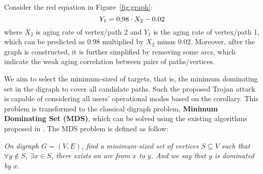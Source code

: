 Consider the red equation in Figure~\ref{fig:graph}:
\begin{equation}
	\centering
	\fontsize{8}{8} \selectfont
	Y_{1} = 0.98 \cdot X_{2} - 0.02
\end{equation}
where $X_{2}$ is aging rate of vertex/path 2 and $Y_{1}$ is the aging rate of vertex/path 1, which can be predicted as 0.98 multiplied by $X_{2}$ minus 0.02.
Moreover, after the graph is constructed, it is further simplified by removing some arcs, which indicate the weak aging correlation between pairs of paths/vertices.

We aim to select the minimum-sized of targets, that is, the minimum dominating set in the digraph to cover all candidate paths. Such the proposed Trojan attack is capable of considering all users' operational modes based on the corollary. This problem is transformed to the classical digraph problem, \textbf{Minimum Dominating Set (MDS)}, which can be solved using the existing algorithms proposed in \cite{ore1962theory}\cite{natarajan1978optimum}. The MDS problem is defined as follow:

\textit{On digraph $G = (V, E)$, find a minimum-sized set of vertices $S \subseteq V$ such that $\forall y \notin S$, $\exists x \in S$, there exists an arc from $x$ to $y$. And we say that $y$ is dominated by $x$}.


